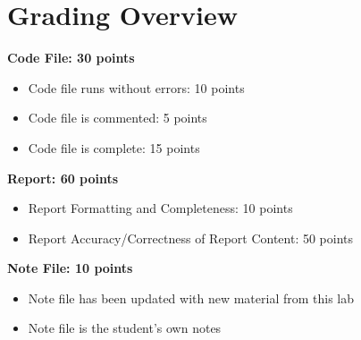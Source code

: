\documentclass{article}
\begin{document}
\section*{Grading Overview}

\textbf{Code File: 30 points}
\begin{itemize}
    \item Code file runs without errors: 10 points
    \item Code file is commented: 5 points
    \item Code file is complete: 15 points
\end{itemize}

\textbf{Report: 60 points}
\begin{itemize}
    \item Report Formatting and Completeness: 10 points
    \item Report Accuracy/Correctness of Report Content: 50 points
\end{itemize}

\textbf{Note File: 10 points}
\begin{itemize}
    \item Note file has been updated with new material from this lab
    \item Note file is the student’s own notes
\end{itemize}
\end{document}
